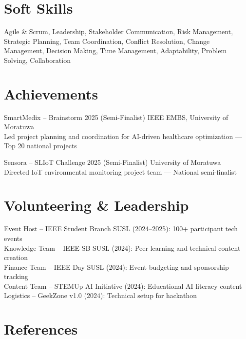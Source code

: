 \documentclass[letterpaper,11pt]{article}
\begin{document}
\section{Soft Skills}
\vspace{-1pt}
Agile \& Scrum, Leadership, Stakeholder Communication, Risk Management, Strategic Planning, Team Coordination, Conflict Resolution, Change Management, Decision Making, Time Management, Adaptability, Problem Solving, Collaboration

\section{Achievements}
\vspace{-1pt}

SmartMedix – Brainstorm 2025 (Semi-Finalist) \hfill IEEE EMBS, University of Moratuwa\\
Led project planning and coordination for AI-driven healthcare optimization — Top 20 national projects

\vspace{5pt}
\noindent Sensora – SLIoT Challenge 2025 (Semi-Finalist) \hfill University of Moratuwa\\
Directed IoT environmental monitoring project team — National semi-finalist

\section{Volunteering \& Leadership}
\vspace{-1pt}
Event Host – IEEE Student Branch SUSL (2024–2025): 100+ participant tech events\\
Knowledge Team – IEEE SB SUSL (2024): Peer-learning and technical content creation\\
Finance Team – IEEE Day SUSL (2024): Event budgeting and sponsorship tracking\\
Content Team – STEMUp AI Initiative (2024): Educational AI literacy content\\
Logistics – GeekZone v1.0 (2024): Technical setup for hackathon


\section{References}
\vspace{-1pt}
\end{document}
